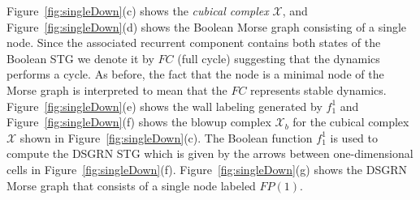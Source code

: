 \documentclass[12pt, notitlepage]{amsart}
\newcommand{\cX}{{\mathcal X}}
\theoremstyle{definition}
\begin{document}
Figure~\ref{fig:singleDown}(c) shows the \textit{cubical complex} $\cX$, and Figure~\ref{fig:singleDown}(d) shows the Boolean Morse graph consisting of a single node. Since the associated recurrent component contains both states of the Boolean STG we denote it by $FC$ (full cycle) suggesting that the dynamics performs a cycle. As before, the fact that the node is a minimal node of the Morse graph is interpreted to mean that the $FC$ represents stable dynamics. Figure~\ref{fig:singleDown}(e) shows the wall labeling generated by $f_1^1$ and Figure~\ref{fig:singleDown}(f) shows the blowup complex $\cX_b$ for the cubical complex $\cX$ shown in Figure~\ref{fig:singleDown}(c). The Boolean function $f_1^1$ is used to compute the DSGRN STG which is given by the arrows between one-dimensional cells in Figure~\ref{fig:singleDown}(f). Figure~\ref{fig:singleDown}(g) shows the DSGRN Morse graph that consists of a single node labeled $FP(1)$.
\end{document}
